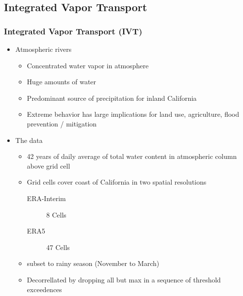 \documentclass[aspectratio=169,10pt,notes]{beamer}
\begin{document}

\subsection{Integrated Vapor Transport}

\begin{frame}
  \frametitle{Integrated Vapor Transport (IVT)}
  \begin{minipage}{.7\textwidth}
    \begin{itemize}
        \item Atmospheric rivers~\citep{ralph2013,ralph2018}
            \begin{itemize}
                \item Concentrated water vapor in atmosphere
                \item Huge amounts of water
                \item Predominant source of precipitation for 
                    inland California
                \item Extreme behavior has large implications 
                    for land use, agriculture, flood prevention / mitigation
            \end{itemize}
        \item The data~\citep{guan2015}
            \begin{itemize}
                \item 42 years of daily average of total water content 
                    in atmospheric column above grid cell
                \item Grid cells cover coast of California in two 
                    spatial resolutions
                    \begin{description}
                        \item[ERA-Interim] 8 Cells
                        \item[ERA5] 47 Cells
                    \end{description}
                \item subset to rainy season (November to March)
                \item Decorrellated by dropping all but max in a sequence of threshold exceedences
            \end{itemize}
    \end{itemize}

\end{minipage}
\end{frame}
\end{document}
